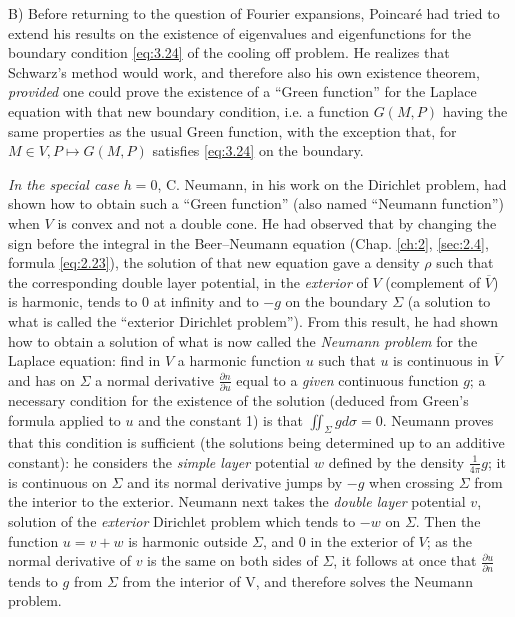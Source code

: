 \documentclass[12pt,a4paper,leqno,twoside]{extbook}
\newcommand{\pder}[2]{\frac{\partial #1}{\partial #2}}
\begin{document}
B) Before returning to the question of Fourier expansions, Poincaré had tried to extend his results on the existence of eigenvalues and eigenfunctions for the boundary condition \eqref{eq:3.24} of the cooling off problem. He realizes that Schwarz's method would work, and therefore also his own existence theorem, \emph{provided} one could prove the existence of a ``Green function'' for the Laplace equation with that new boundary condition, i.e. a function \(G(M, P)\) having the same properties as the usual Green function, with the exception that, for \(M \in V, P \mapsto G(M, P)\) satisfies \eqref{eq:3.24} on the boundary.

\emph{In the special case} \(h=0\), C. Neumann, in his work on the Dirichlet problem, had shown how to obtain such a ``Green function'' (also named ``Neumann function'') when \(V\) is convex and not a double cone. He had observed that by changing the sign before the integral in the Beer--Neumann equation (Chap. \ref{ch:2}, \ref{sec:2.4}, formula \eqref{eq:2.23}), the solution of that new equation gave a density \(\rho\) such that the corresponding double layer potential, in the \emph{exterior} of \(V\) (complement of \(\overline{V}\)) is harmonic, tends to 0 at infinity and to \(-g\) on the boundary \(\Sigma\) (a solution to what is called the ``exterior Dirichlet problem''). From this result, he had shown how to obtain a solution of what is now called the \emph{Neumann problem} for the Laplace equation: find in \(V\) a harmonic function \(u\) such that \(u\) is continuous in \(\overline{V}\) and has on \(\Sigma\) a normal derivative \(\pder{n}{u}\) equal to a \emph{given} continuous function \(g\); a necessary condition for the existence of the solution (deduced from Green's formula applied to \(u\) and the constant 1) is that \(\iint_\Sigma g d\sigma = 0\). Neumann proves that this condition is sufficient (the solutions being determined up to an additive constant): he considers the \emph{simple layer} potential \(w\) defined by the density \(\frac{1}{4\pi} g\); it is continuous on \(\Sigma\) and its normal derivative jumps by \(-g\) when crossing \(\Sigma\) from the interior to the exterior. Neumann next takes the \emph{double layer} potential \(v\), solution of the \emph{exterior} Dirichlet problem which tends to \(-w\) on \(\Sigma\). Then the function \(u = v + w\) is harmonic outside \(\Sigma\), and 0 in the exterior of \(V\); as the normal derivative of \(v\) is the same on both sides of \(\Sigma\), it follows at once that \(\pder{u}{n}\) tends to \(g\) from \(\Sigma\) from the interior of \(\)V, and therefore solves the Neumann problem.
\end{document}
